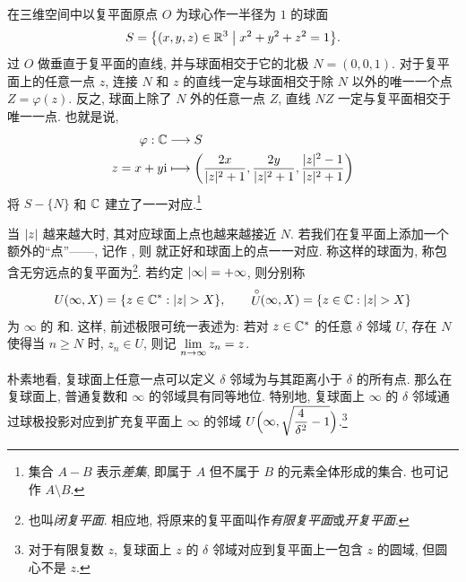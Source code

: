 在三维空间中以复平面原点 $O$ 为球心作一半径为 $1$ 的球面
\[
  S=\bigl\{(x,y,z)\in{\mathbb{R}}^3\bigm\vert x^2+y^2+z^2=1\bigr\}.
\]
过 $O$ 做垂直于复平面的直线, 并与球面相交于它的北极 $N=(0,0,1)$.
对于复平面上的任意一点 $z$, 连接 $N$ 和 $z$ 的直线一定与球面相交于除 $N$ 以外的唯一一个点 $Z=\varphi(z)$.
反之, 球面上除了 $N$ 外的任意一点 $Z$, 直线 $NZ$ 一定与复平面相交于唯一一点.
也就是说, 
\begin{equation}
  \label{eq:polar-project}
  \begin{aligned}
    \varphi:{\mathbb{C}}&\longrightarrow S\\
    z=x+y\mathrm{i}&\longmapsto \biggl(\frac{2x}{\lvert z\rvert^2+1},\frac{2y}{\lvert z\rvert^2+1},\frac{\lvert z\rvert^2-1}{\lvert z\rvert^2+1}\biggr)
  \end{aligned}
\end{equation}
将 $S-\{N\}$ 和 ${\mathbb{C}}$ 建立了一一对应.\footnote{
  集合 $A-B$ 表示\emph{差集}, 即属于 $A$ 但不属于 $B$ 的元素全体形成的集合.
  也可记作 $A\setminus B$.
}

当 $\lvert z\rvert$ 越来越大时, 其对应球面上点也越来越接近 $N$.
若我们在复平面上添加一个额外的``点''——, 记作 \nouns{$\infty$}, 则 就正好和球面上的点一一对应.
称这样的球面为, 称包含无穷远点的复平面为\footnote{
  也叫\emph{闭复平面}. 相应地, 将原来的复平面叫作\emph{有限复平面}或\emph{开复平面}.
}.
若约定 $\lvert\infty\rvert=+\infty$, 则分别称
\[
  U(\infty,X)=\{z\in{\mathbb{C}}^*\mathrel{:} \lvert z\rvert>X\},\qquad
  \stackrel{\circ}{U}\!\!(\infty,X)=\{z\in{\mathbb{C}}\mathrel{:} \lvert z\rvert>X\}
\]
为 $\infty$ 的 和.
这样, 前述极限可统一表述为: 若对 $z\in{\mathbb{C}}^*$ 的任意 $\delta$ 邻域 $U$, 存在 $N$ 使得当 $n\ge N$ 时, $z_n\in U$, 则记 $\lim\limits_{n\rightarrow\infty}z_n=z$.

朴素地看, 复球面上任意一点可以定义 $\delta$ 邻域为与其距离小于 $\delta$ 的所有点.
那么在复球面上, 普通复数和 $\infty$ 的邻域具有同等地位.
特别地, 复球面上 $\infty$ 的 $\delta$ 邻域通过球极投影对应到扩充复平面上 $\infty$ 的邻域
$U\Bigl(\infty, \sqrt{\dfrac4{\delta^2}-1}\Bigr)$.\footnote{
  对于有限复数 $z$, 复球面上 $z$ 的 $\delta$ 邻域对应到复平面上一包含 $z$ 的圆域, 但圆心不是 $z$.
}

